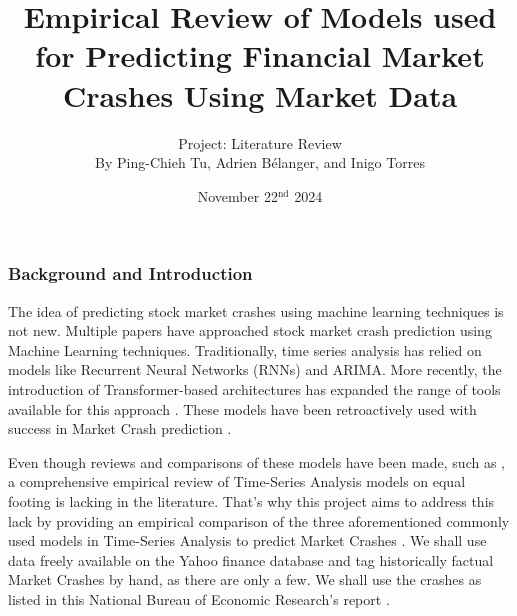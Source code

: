 \documentclass[12pt, letterpaper]{article}
\title{Empirical Review of Models used for Predicting Financial Market Crashes Using Market Data}
\author{\large Project: Literature Review \vspace{0.65em} \\ \normalsize By Ping-Chieh Tu, Adrien Bélanger, and Inigo Torres}
\date{November 22$^{\text{nd}}$ 2024}
\begin{document}
\maketitle 

\justifying %
\begin{comment}
Overall objective to keep in mind:

"In this milestone, the objective is to review the related literature to your proposal. This will better inform your methodology for your project if it involves a new idea, and it is necessary if you are comparing existing methods for a certain domain. It may even lead to a change of proposal, once you learn about existing methods out there. If you are producing a literature survey on a research topic, in this stage, you just provide a "breadth" review, in which you emphasize covering as many related works as possible and providing some preliminary organization without going into much detail."\\

Evaluation Criterias:

- Putting your proposal into context of related literature

- Coverage (are you adequately covering most relevant works)
\end{comment}

\subsubsection*{Background and Introduction}
The idea of predicting stock market crashes using machine learning techniques is not new.
Multiple papers have approached stock market crash prediction using Machine Learning techniques. 
Traditionally, time series analysis has relied on models like Recurrent Neural Networks (RNNs) and ARIMA. More recently, the introduction of Transformer-based architectures has expanded the range of tools available for this approach \cite{Ahmed, ArunKumar}. These models have been retroactively used with success in Market Crash prediction \cite{Okpeke}. 

Even though reviews and comparisons of these models have been made, such as \cite{Okpeke}, a comprehensive empirical review of Time-Series Analysis models on equal footing is lacking in the literature. 
That's why this project aims to address this lack by providing an empirical comparison of the three aforementioned commonly used models in Time-Series Analysis to predict Market Crashes \cite{Ahmed}\cite{ArunKumar}.
We shall use data freely available on the Yahoo finance database and tag historically factual Market Crashes by hand, as there are only a few. We shall use the crashes as listed in this  National Bureau of Economic Research's report \cite{Mishkin}.
\end{document}
